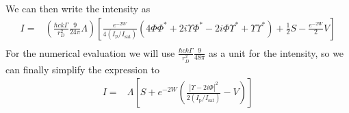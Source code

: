\documentclass[11pt,letter]{article}
\begin{document}
We can then write the intensity as 
\begin{equation}
\begin{split}
 I  = &
 \left( 
 \frac{\hbar c k \Gamma}{r_{D}^{2}}  
     \frac{9}{24\pi} \Lambda 
  \right)
  \left[
  \frac{ e^{-2W} }{ 4 (I_{\mathrm{p}}/I_{\mathrm{sat}})}
  \left( 
    4 \Phi \Phi^{*}
    + 2i \Upsilon \Phi^{*} 
    - 2i \Phi \Upsilon^{*}
    + \Upsilon \Upsilon^{*}  
          \right)
  + \frac{1}{2}S - \frac{ e^{-2W}}{2} V 
\right] \\ 
\end{split}
\end{equation}
For the numerical evaluation we will use $\frac{\hbar c k \Gamma}{r_{D}^{2}}  
     \frac{9}{48\pi}$  as a unit for the intensity, so we can finally simplify the expression to
\begin{equation}
\begin{split}
  I  = &
 \Lambda 
  \left[
  S + 
  e^{-2W} \left(  
  \frac{ | \Upsilon - 2 i \Phi |^{2} }{  2 (I_{\mathrm{p}}/I_{\mathrm{sat}})}
   - V \right)
  \right] \\ 
\end{split}
\end{equation}
\end{document}
